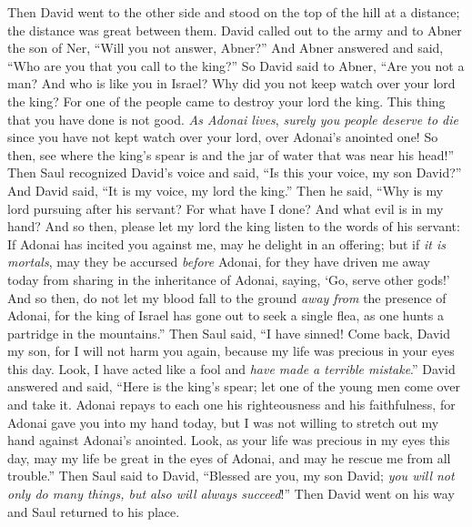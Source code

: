 \begin{biblechapter}
\verse Then David went to the other side and stood on the top of the hill at a distance; the distance was great between them.
\verse David called out to the army and to Abner the son of Ner, “Will you not answer, Abner?” And Abner answered and said, “Who are you that you call to the king?”
\verse So David said to Abner, “Are you not a man? And who is like you in Israel? Why did you not keep watch over your lord the king? For one of the people came to destroy your lord the king.
\verse This thing that you have done is not good. \textit{As Adonai lives}, \textit{surely you people deserve to die} since you have not kept watch over your lord, over Adonai’s anointed one! So then, see where the king’s spear is and the jar of water that was near his head!”
\verse Then Saul recognized David’s voice and said, “Is this your voice, my son David?” And David said, “It is my voice, my lord the king.”
\verse Then he said, “Why is my lord pursuing after his servant? For what have I done? And what evil is in my hand?
\verse And so then, please let my lord the king listen to the words of his servant: If Adonai has incited you against me, may he delight in an offering; but if \textit{it is mortals}, may they be accursed \textit{before} Adonai, for they have driven me away today from sharing in the inheritance of Adonai, saying, ‘Go, serve other gods!’
\verse And so then, do not let my blood fall to the ground \textit{away from} the presence of Adonai, for the king of Israel has gone out to seek a single flea, as one hunts a partridge in the mountains.”
\verse Then Saul said, “I have sinned! Come back, David my son, for I will not harm you again, because my life was precious in your eyes this day. Look, I have acted like a fool and \textit{have made a terrible mistake}.”
\verse David answered and said, “Here is the king’s spear; let one of the young men come over and take it.
\verse Adonai repays to each one his righteousness and his faithfulness, for Adonai gave you into my hand today, but I was not willing to stretch out my hand against Adonai’s anointed.
\verse Look, as your life was precious in my eyes this day, may my life be great in the eyes of Adonai, and may he rescue me from all trouble.”
\verse Then Saul said to David, “Blessed are you, my son David; \textit{you will not only do many things, but also will always succeed}!” Then David went on his way and Saul returned to his place.
\end{biblechapter}

